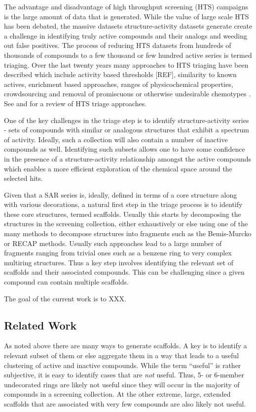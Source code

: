 \documentclass[journal=jacsat,manuscript=article]{achemso}
\begin{document}
The advantage and disadvantage of high throughput screening (HTS) campaigns is the large amount of data that is generated. While the value of large scale HTS has been debated\cite{Macarron:2011qv}, the massive datasets structure-activity datasets generate create a  challenge in identifying truly active compounds and their analogs and weeding out false positives. The process of reducing HTS datasets from hundreds of thousands of compounds to a few thousand or few hundred active series is termed triaging. Over the last twenty years many approaches to HTS triaging have been described which include activity based thresholds [REF], similarity to known actives, enrichment based approaches\cite{Varin2010CSE,Pu:2012wf}, ranges of physicochemical properties\cite{Cox:2012qy}, crowdsourcing\cite{Peng:2013qp}  and removal of promiscuous or otherwise undesirable chemotypes \cite{Dahlin:2014fp}. See \citeauthor{Shun:2011sy}  and \citeauthor{Langer:2009mw} for a review of HTS triage approaches.

One of the key challenges in the triage step is to identify structure-activity series - sets of compounds with similar or analogous structures that exhibit a spectrum of activity. Ideally, such a collection will also contain a number of inactive compounds as well. Identifying such subsets allows one to have some confidence in the presence of a structure-activity relationship amongst the active compounds which enables a more efficient exploration of the chemical space around the selected hits.

Given that a SAR series is, ideally, defined in terms of a core structure along with various decorations, a natural first step in the triage process is to identify these core structures, termed scaffolds. Usually this starts by decomposing the structures in the screening collection, either exhaustively or else using one of the many methods to decompose structures into fragments such as the Bemis-Murcko\cite{BemisMurcko1999,BemisMurcko1996} or RECAP methods\cite{Lewell:1998aa}. Usually such approaches lead to a large number of fragments ranging from trivial ones such as a benzene ring to very complex multiring structures. Thus a key step involves identifying the relevant set of scaffolds and their associated compounds. This can be challenging since a given compound can contain multiple scaffolds.

The goal of the current work is to XXX.

\subsection{Related Work}
As noted above there are many ways to generate scaffolds. A key is to identify a relevant subset of them or else aggregate them in a way that leads to a useful clustering of active and inactive compounds. While the term ``useful'' is rather subjective, it is easy to identify cases that are \emph{not} useful. Thus, 5- or 6-member undecorated rings are likely not useful since they will occur in the majority of compounds in a screening collection. At the other extreme, large, extended scaffolds that are associated with very few compounds are also likely not useful. 
\end{document}
